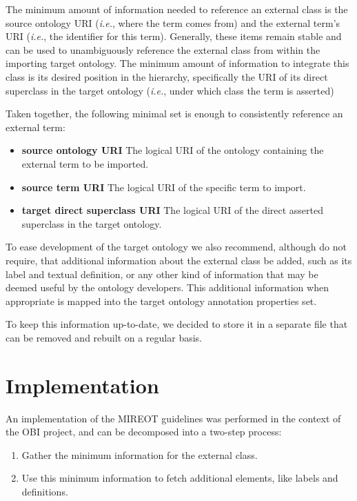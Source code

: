 \documentclass{ao2e}%
\begin{document}
The minimum amount of information needed to reference an external class is the source ontology URI (\textit {i.e.}, where the term comes from) and the external term's URI (\textit {i.e.}, the identifier for this term). 
Generally, these items remain stable and can be used to unambiguously reference the external class from within the importing target ontology.
The minimum amount of information to integrate this class is its desired position in the hierarchy, specifically the URI of its direct superclass in the target ontology (\textit {i.e.}, under which class the term is asserted)

Taken together, the following minimal set is enough to consistently reference an external term:
\begin{itemize}
 \item \textbf{source ontology URI} The logical URI of the ontology containing the external term to be imported. 
 \item \textbf{source term URI} The logical URI of the specific term to import. 
 \item \textbf{target direct superclass URI} The logical URI of the direct asserted superclass in the target ontology.
\end{itemize} 

To ease development of the target ontology we also recommend, although do not require, that additional information about the external class be added, such as its label and textual definition, or any other kind of information that may be deemed useful by the ontology developers.
This additional information when appropriate is mapped into the target ontology annotation properties set.

To keep this information up-to-date, we decided to store it in a separate file that can be removed and rebuilt on a regular basis.


\section{Implementation}

An implementation of the \ac{MIREOT} guidelines was performed in the context of the \ac{OBI} project, and can be decomposed into a two-step process:

\begin{enumerate}
\item Gather the minimum information for the external class.
\item Use this minimum information to fetch additional elements, like labels and definitions.
\end{enumerate}
\end{document}

